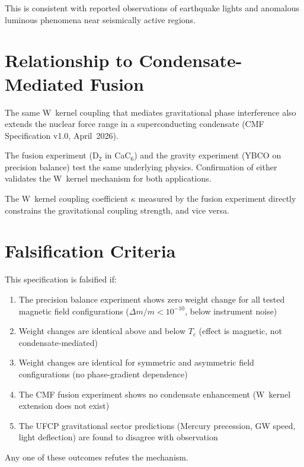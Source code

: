 \documentclass[11pt, a4paper]{article}
\begin{document}
This is consistent with reported observations of earthquake
lights and anomalous luminous phenomena near seismically active
regions.

\section{Relationship to Condensate-Mediated Fusion}

The same W~kernel coupling that mediates gravitational phase
interference also extends the nuclear force range in a
superconducting condensate (CMF Specification v1.0, April~2026).

The fusion experiment (D$_2$ in CaC$_6$) and the gravity
experiment (YBCO on precision balance) test the same underlying
physics. Confirmation of either validates the W~kernel mechanism
for both applications.

The W~kernel coupling coefficient $\kappa$ measured by the
fusion experiment directly constrains the gravitational coupling
strength, and vice versa.

\section{Falsification Criteria}

This specification is falsified if:

\begin{enumerate}[nosep]
  \item The precision balance experiment shows zero weight
        change for all tested magnetic field configurations
        ($\Delta m/m < 10^{-10}$, below instrument noise)
  \item Weight changes are identical above and below $T_c$
        (effect is magnetic, not condensate-mediated)
  \item Weight changes are identical for symmetric and
        asymmetric field configurations (no phase-gradient
        dependence)
  \item The CMF fusion experiment shows no condensate
        enhancement (W~kernel extension does not exist)
  \item The UFCP gravitational sector predictions (Mercury
        precession, GW speed, light deflection) are found to
        disagree with observation
\end{enumerate}

Any one of these outcomes refutes the mechanism.
\end{document}
